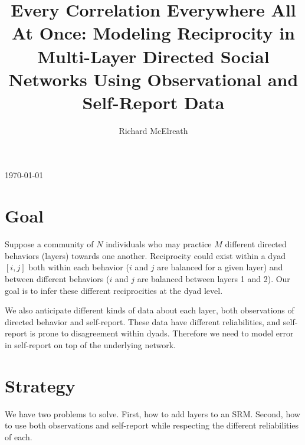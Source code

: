 \documentclass[reqno ,12pt]{amsart}
\begin{document}
\title[Every Correlation Everywhere All At Once]{Every Correlation Everywhere All At Once: Modeling Reciprocity in Multi-Layer Directed Social Networks Using Observational and Self-Report Data}
\author{Richard McElreath}
\address{Department of Human Behavior, Ecology and Culture, Max Planck Institute for Evolutionary Anthropology, Leipzig, Germany}


\maketitle

{\vspace{-6pt}\footnotesize\begin{center}\today\end{center}\vspace{12pt}}

\linenumbers
\modulolinenumbers[3]



\section{Goal}

Suppose a community of $N$ individuals who may practice $M$ different directed behaviors (layers) towards one another. Reciprocity could exist within a dyad $[i,j]$ both within each behavior ($i$ and $j$ are balanced for a given layer) and between different behaviors ($i$ and $j$ are balanced between layers 1 and 2). Our goal is to infer these different reciprocities at the dyad level. 

We also anticipate different kinds of data about each layer, both observations of directed behavior and self-report. These data have different reliabilities, and self-report is prone to disagreement within dyads. Therefore we need to model error in self-report on top of the underlying network.

\section{Strategy}

We have two problems to solve. First, how to add layers to an SRM. Second, how to use both observations and self-report while respecting the different reliabilities of each.
\end{document}
